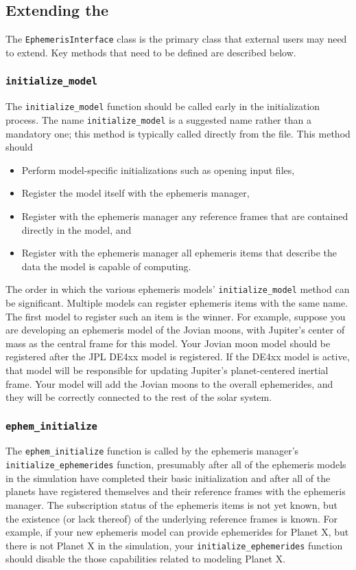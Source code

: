 \subsection{Extending the \ModelDesc}
The \verb|EphemerisInterface| class is the primary class that
external users may need to extend. Key methods that need to be
defined are described below.



\subsubsection{\texttt{initialize\_model}}
The \texttt{initialize\_model} function should be called early in the
initialization process.
The name \texttt{initialize\_model} is a suggested name
rather than a mandatory one;
this method is typically called directly from the
\Sdefine file. This method should\begin{itemize}
\item Perform model-specific initializations such as opening input files,
\item Register the model itself with the ephemeris manager,
\item Register with the ephemeris manager any reference frames that are
  contained directly in the model, and
\item Register with the ephemeris manager all ephemeris items that
  describe the data the model is capable of computing.
\end{itemize}
The order in which the various ephemeris models'
\texttt{initialize\_model} method can be significant.
Multiple models can register ephemeris items with the same name.
The first model to register such an item is the winner.
For example, suppose you are developing an ephemeris model of the Jovian
moons, with Jupiter's center of mass as the central frame for this model.
Your Jovian moon model should be registered after the JPL DE4xx model
is registered. If the DE4xx model is active, that model will be responsible for
updating Jupiter's planet-centered inertial frame. Your model will add
the Jovian moons to the overall ephemerides, and they will be correctly
connected to the rest of the solar system.

\subsubsection{\texttt{ephem\_initialize}}
The \texttt{ephem\_initialize} function is called by the
ephemeris manager's \texttt{initialize\_ephemerides} function,
presumably after all of the ephemeris models in the simulation have completed
their basic initialization and after all of the planets have registered
themselves and their reference frames with the ephemeris manager.
The subscription status of the ephemeris items is not yet known, but
the existence (or lack thereof) of the underlying reference frames is known.
For example, if your new ephemeris model can provide ephemerides for
Planet X, but there is not Planet X in the simulation, your
\texttt{initialize\_ephemerides} function should disable the
those capabilities related to modeling Planet X.

